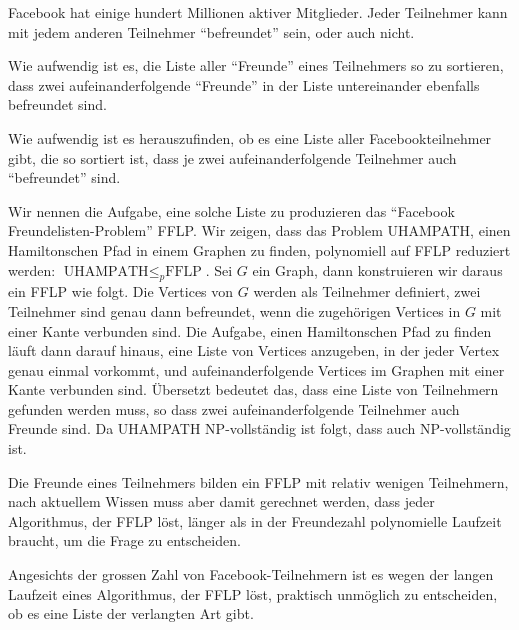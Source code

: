 Facebook hat einige hundert Millionen aktiver Mitglieder.
Jeder Teilnehmer kann mit jedem anderen Teilnehmer ``befreundet''
sein, oder auch nicht.
\begin{teilaufgaben}
\item
Wie aufwendig ist es, die Liste aller ``Freunde''
eines Teilnehmers so zu sortieren, dass zwei aufeinanderfolgende ``Freunde''
in der Liste untereinander ebenfalls befreundet sind.
\item
Wie aufwendig
ist es herauszufinden, ob es eine Liste aller Facebookteilnehmer gibt,
die so sortiert ist, dass je zwei aufeinanderfolgende Teilnehmer
auch ``befreundet'' sind.
\end{teilaufgaben}


\begin{loesung}
Wir nennen die Aufgabe, eine solche Liste zu produzieren das ``Facebook
Freundelisten-Problem'' FFLP. Wir zeigen, dass das Problem
UHAMPATH, einen Hamiltonschen Pfad in einem Graphen zu finden,
polynomiell auf FFLP reduziert werden:
$\text{UHAMPATH}\le_p\text{FFLP}$.
Sei $G$ ein Graph, dann konstruieren wir daraus ein FFLP wie
folgt. Die Vertices von $G$ werden als Teilnehmer definiert,
zwei Teilnehmer sind genau dann befreundet, wenn die zugehörigen
Vertices in $G$ mit einer Kante verbunden sind. Die Aufgabe, einen
Hamiltonschen Pfad zu finden läuft dann darauf hinaus, eine Liste
von Vertices anzugeben, in der jeder Vertex genau einmal vorkommt,
und aufeinanderfolgende Vertices im Graphen mit einer Kante verbunden
sind. Übersetzt bedeutet das, dass eine Liste von Teilnehmern gefunden
werden muss, so dass zwei aufeinanderfolgende Teilnehmer auch Freunde sind.
Da UHAMPATH NP-vollständig ist folgt, dass auch  NP-vollständig
ist.
\begin{teilaufgaben}
\item Die Freunde eines Teilnehmers bilden ein FFLP mit relativ wenigen
Teilnehmern, nach aktuellem Wissen muss aber damit gerechnet werden,
dass jeder Algorithmus, der FFLP löst, länger als in der Freundezahl
polynomielle Laufzeit braucht, um die Frage zu entscheiden.
\item Angesichts der grossen Zahl von Facebook-Teilnehmern ist es
wegen der langen Laufzeit eines Algorithmus, der FFLP löst,
praktisch unmöglich zu entscheiden, ob es eine Liste der verlangten
Art gibt.
\qedhere
\end{teilaufgaben}
\end{loesung}
